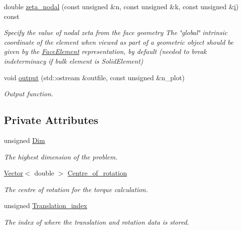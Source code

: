 \begin{DoxyCompactItemize}
double \hyperlink{classoomph_1_1NavierStokesSurfaceDragTorqueElement_af864929a9dbd0ed1d464db1a1d9a93b9}{zeta\+\_\+nodal} (const unsigned \&n, const unsigned \&k, const unsigned \&\hyperlink{cfortran_8h_adb50e893b86b3e55e751a42eab3cba82}{i}) const
\begin{DoxyCompactList}\small\item\em Specify the value of nodal zeta from the face geometry The \char`\"{}global\char`\"{} intrinsic coordinate of the element when viewed as part of a geometric object should be given by the \hyperlink{classoomph_1_1FaceElement}{Face\+Element} representation, by default (needed to break indeterminacy if bulk element is Solid\+Element) \end{DoxyCompactList}\item 
void \hyperlink{classoomph_1_1NavierStokesSurfaceDragTorqueElement_a33f0eed12184789804f001c58d5fea87}{output} (std\+::ostream \&outfile, const unsigned \&n\+\_\+plot)
\begin{DoxyCompactList}\small\item\em Output function. \end{DoxyCompactList}\end{DoxyCompactItemize}
\subsection*{Private Attributes}
\begin{DoxyCompactItemize}
\item 
unsigned \hyperlink{classoomph_1_1NavierStokesSurfaceDragTorqueElement_a94a4f0f7a59474a11bcf590320edaa43}{Dim}
\begin{DoxyCompactList}\small\item\em The highest dimension of the problem. \end{DoxyCompactList}\item 
\hyperlink{classoomph_1_1Vector}{Vector}$<$ double $>$ \hyperlink{classoomph_1_1NavierStokesSurfaceDragTorqueElement_a259b32d562083695f6d187e1ec997a69}{Centre\+\_\+of\+\_\+rotation}
\begin{DoxyCompactList}\small\item\em The centre of rotation for the torque calculation. \end{DoxyCompactList}\item 
unsigned \hyperlink{classoomph_1_1NavierStokesSurfaceDragTorqueElement_a2069bd9eecb7f131738d98e0b110c66d}{Translation\+\_\+index}
\begin{DoxyCompactList}\small\item\em The index of where the translation and rotation data is stored. \end{DoxyCompactList}\end{DoxyCompactItemize}
